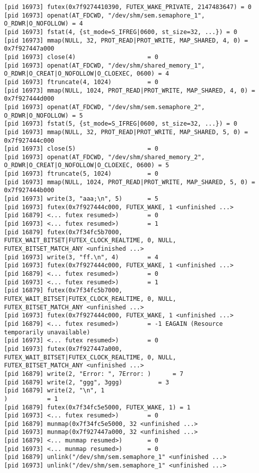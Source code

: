 \documentclass[a4paper, 12pt]{article}
\begin{document}
\begin{lstlisting}
[pid 16973] futex(0x7f9274410390, FUTEX_WAKE_PRIVATE, 2147483647) = 0
[pid 16973] openat(AT_FDCWD, "/dev/shm/sem.semaphore_1", O_RDWR|O_NOFOLLOW) = 4
[pid 16973] fstat(4, {st_mode=S_IFREG|0600, st_size=32, ...}) = 0
[pid 16973] mmap(NULL, 32, PROT_READ|PROT_WRITE, MAP_SHARED, 4, 0) = 0x7f927447a000
[pid 16973] close(4)                    = 0
[pid 16973] openat(AT_FDCWD, "/dev/shm/shared_memory_1", O_RDWR|O_CREAT|O_NOFOLLOW|O_CLOEXEC, 0600) = 4
[pid 16973] ftruncate(4, 1024)          = 0
[pid 16973] mmap(NULL, 1024, PROT_READ|PROT_WRITE, MAP_SHARED, 4, 0) = 0x7f927444d000
[pid 16973] openat(AT_FDCWD, "/dev/shm/sem.semaphore_2", O_RDWR|O_NOFOLLOW) = 5
[pid 16973] fstat(5, {st_mode=S_IFREG|0600, st_size=32, ...}) = 0
[pid 16973] mmap(NULL, 32, PROT_READ|PROT_WRITE, MAP_SHARED, 5, 0) = 0x7f927444c000
[pid 16973] close(5)                    = 0
[pid 16973] openat(AT_FDCWD, "/dev/shm/shared_memory_2", O_RDWR|O_CREAT|O_NOFOLLOW|O_CLOEXEC, 0600) = 5
[pid 16973] ftruncate(5, 1024)          = 0
[pid 16973] mmap(NULL, 1024, PROT_READ|PROT_WRITE, MAP_SHARED, 5, 0) = 0x7f927444b000
[pid 16973] write(3, "aaa;\n", 5)       = 5
[pid 16973] futex(0x7f927444c000, FUTEX_WAKE, 1 <unfinished ...>
[pid 16879] <... futex resumed>)        = 0
[pid 16973] <... futex resumed>)        = 1
[pid 16879] futex(0x7f34fc5b7000, FUTEX_WAIT_BITSET|FUTEX_CLOCK_REALTIME, 0, NULL, FUTEX_BITSET_MATCH_ANY <unfinished ...>
[pid 16973] write(3, "ff.\n", 4)        = 4
[pid 16973] futex(0x7f927444c000, FUTEX_WAKE, 1 <unfinished ...>
[pid 16879] <... futex resumed>)        = 0
[pid 16973] <... futex resumed>)        = 1
[pid 16879] futex(0x7f34fc5b7000, FUTEX_WAIT_BITSET|FUTEX_CLOCK_REALTIME, 0, NULL, FUTEX_BITSET_MATCH_ANY <unfinished ...>
[pid 16973] futex(0x7f927444c000, FUTEX_WAKE, 1 <unfinished ...>
[pid 16879] <... futex resumed>)        = -1 EAGAIN (Resource temporarily unavailable)
[pid 16973] <... futex resumed>)        = 0
[pid 16973] futex(0x7f927447a000, FUTEX_WAIT_BITSET|FUTEX_CLOCK_REALTIME, 0, NULL, FUTEX_BITSET_MATCH_ANY <unfinished ...>
[pid 16879] write(2, "Error: ", 7Error: )      = 7
[pid 16879] write(2, "ggg", 3ggg)          = 3
[pid 16879] write(2, "\n", 1
)           = 1
[pid 16879] futex(0x7f34fc5e5000, FUTEX_WAKE, 1) = 1
[pid 16973] <... futex resumed>)        = 0
[pid 16879] munmap(0x7f34fc5e5000, 32 <unfinished ...>
[pid 16973] munmap(0x7f927447a000, 32 <unfinished ...>
[pid 16879] <... munmap resumed>)       = 0
[pid 16973] <... munmap resumed>)       = 0
[pid 16879] unlink("/dev/shm/sem.semaphore_1" <unfinished ...>
[pid 16973] unlink("/dev/shm/sem.semaphore_1" <unfinished ...>

\end{lstlisting}
\end{document}
